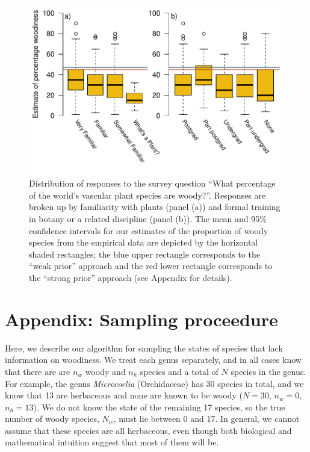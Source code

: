 \documentclass[12pt]{article}
\begin{document}
\begin{figure}[p]
  \centering
  \includegraphics{figs/survey-results}
  \caption{Distribution of responses to the survey question ``What
    percentage of the world's vascular plant species are
    woody?''. Responses are broken up by familiarity with plants
    (panel (a)) and formal training in botany or a related discipline
    (panel (b)). The mean and 95\% confidence intervals for our
    estimates of the proportion of woody species from the empirical
    data are depicted by the horizontal shaded rectangles; the blue
    upper rectangle corresponds to the ``weak prior'' approach and the
    red lower rectangle corresponds to the ``strong prior'' approach
    (see Appendix for details).}
  \label{fig:survey}
\end{figure}

\clearpage
\renewcommand\thefigure{S.\arabic{figure}}
\appendix
\section{Appendix: Sampling proceedure}
\setcounter{figure}{0}    

Here, we describe our algorithm for sampling the states of species
that lack information on woodiness. We treat each genus separately,
and in all cases know that there are are $n_w$ woody and $n_h$ species
and a total of $N$ species in the genus.
%
For example, the genus \textit{Microcoelia} (Orchidaceae) has 30
species in total, and we know that 13 are herbaceous and none are
known to be woody ($N = 30$, $n_w = 0$, $n_h = 13$). We do not know
the state of the remaining 17 species, so the true number of woody
species, $N_w$, must lie between 0 and 17. In general, we cannot
assume that these species are all herbaceous, even though both
biological and mathematical intuition suggest that most of them will
be.
\end{document}
